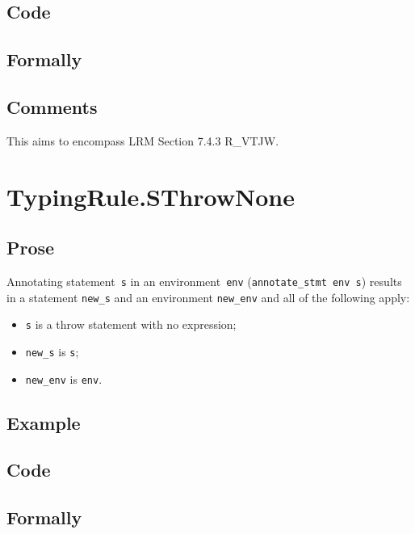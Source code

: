 \documentclass{book}
\begin{document}
  \subsection{Code}

\begin{emptyformal}
    \subsection{Formally}
\end{emptyformal}

\subsection{Comments}
    This aims to encompass LRM Section 7.4.3 R\_VTJW.
 

\section{TypingRule.SThrowNone \label{sec:TypingRule.SThrowNone}}

  \subsection{Prose}
Annotating statement~\texttt{s} in an environment~\texttt{env}
(\texttt{annotate\_stmt env s}) results in a statement \texttt{new\_s} and an
environment \texttt{new\_env} and all of the following apply:
   \begin{itemize}
   \item \texttt{s} is a throw statement with no expression;
   \item \texttt{new\_s} is \texttt{s};
   \item \texttt{new\_env} is \texttt{env}.
   \end{itemize}

  \subsection{Example}

  \subsection{Code}

\begin{emptyformal}
    \subsection{Formally}
\end{emptyformal}
\end{document}
